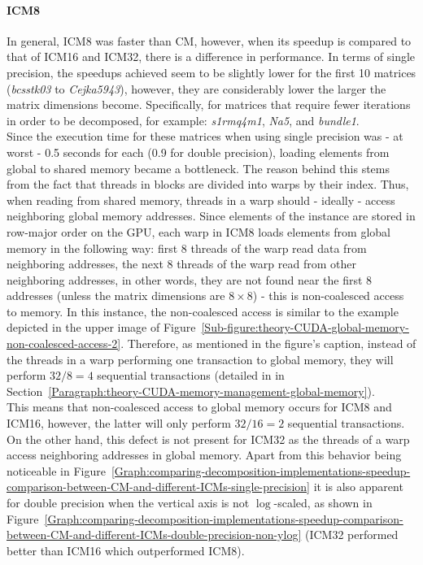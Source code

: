 \paragraph{ICM8} In general, ICM8 was faster than CM, however, when its speedup is compared to that of ICM16 and ICM32, there is a difference in performance. In terms of single precision, the speedups achieved seem to be slightly lower for the first 10 matrices (\textit{bcsstk03} to \textit{Cejka5943}), however, they are considerably lower the larger the matrix dimensions become. Specifically, for matrices that require fewer iterations in order to be decomposed, for example: \textit{s1rmq4m1}, \textit{Na5}, and \textit{bundle1}. \\
Since the execution time for these matrices when using single precision was - at worst - 0.5 seconds for each (0.9 for double precision), loading elements from global to shared memory became a bottleneck. The reason behind this stems from the fact that threads in blocks are divided into warps by their  index. Thus, when reading from shared memory, threads in a warp should - ideally - access neighboring global memory addresses. Since elements of the  instance are stored in row-major order on the GPU, each warp in ICM8 loads elements from global memory in the following way: first 8 threads of the warp read data from neighboring addresses, the next 8 threads of the warp read from other neighboring addresses, in other words, they are not found near the first 8 addresses (unless the matrix dimensions are $ 8\times 8 $) - this is non-coalesced access to memory. In this instance, the non-coalesced access is similar to the example depicted in the upper image of Figure~\ref{Sub-figure:theory-CUDA-global-memory-non-coalesced-access-2}. Therefore, as mentioned in the figure's caption, instead of the threads in a warp performing one transaction to global memory, they will perform $ 32/8 = 4 $ sequential transactions (detailed in \textit{} in Section~\ref{Paragraph:theory-CUDA-memory-management-global-memory}). \\
This means that non-coalesced access to global memory occurs for ICM8 and ICM16, however, the latter will only perform $ 32/16 = 2 $ sequential transactions. On the other hand, this defect is not present for ICM32 as the threads of a warp access  neighboring addresses in global memory. Apart from this behavior being noticeable in Figure~\ref{Graph:comparing-decomposition-implementations-speedup-comparison-between-CM-and-different-ICMs-single-precision} it is also apparent for double precision when the vertical axis is not $ \log $-scaled, as shown in Figure~\ref{Graph:comparing-decomposition-implementations-speedup-comparison-between-CM-and-different-ICMs-double-precision-non-ylog} (ICM32 performed better than ICM16 which outperformed ICM8).

